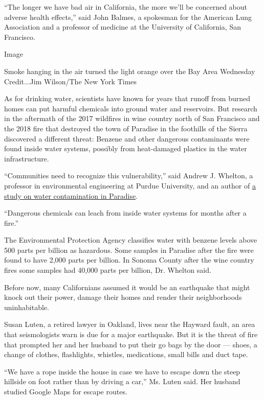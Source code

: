 ``The longer we have bad air in California, the more we'll be concerned
about adverse health effects,'' said John Balmes, a spokesman for the
American Lung Association and a professor of medicine at the University
of California, San Francisco.

Image

Smoke hanging in the air turned the light orange over the Bay Area
Wednesday Credit...Jim Wilson/The New York Times

As for drinking water, scientists have known for years that runoff from
burned homes can put harmful chemicals into ground water and reservoirs.
But research in the aftermath of the 2017 wildfires in wine country
north of San Francisco and the 2018 fire that destroyed the town of
Paradise in the foothills of the Sierra discovered a different threat:
Benzene and other dangerous contaminants were found inside water
systems, possibly from heat-damaged plastics in the water
infrastructure.

``Communities need to recognize this vulnerability,'' said Andrew J.
Whelton, a professor in environmental engineering at Purdue University,
and an author of
\href{https://awwa.onlinelibrary.wiley.com/doi/full/10.1002/aws2.1183}{a
study on water contamination in Paradise}.

``Dangerous chemicals can leach from inside water systems for months
after a fire.''

The Environmental Protection Agency classifies water with benzene levels
above 500 parts per billion as hazardous. Some samples in Paradise after
the fire were found to have 2,000 parts per billion. In Sonoma County
after the wine country fires some samples had 40,000 parts per billion,
Dr. Whelton said.

Before now, many Californians assumed it would be an earthquake that
might knock out their power, damage their homes and render their
neighborhoods uninhabitable.

Susan Luten, a retired lawyer in Oakland, lives near the Hayward fault,
an area that seismologists warn is due for a major earthquake. But it is
the threat of fire that prompted her and her husband to put their go
bags by the door --- shoes, a change of clothes, flashlights, whistles,
medications, small bills and duct tape.

``We have a rope inside the house in case we have to escape down the
steep hillside on foot rather than by driving a car,'' Ms. Luten said.
Her husband studied Google Maps for escape routes.

